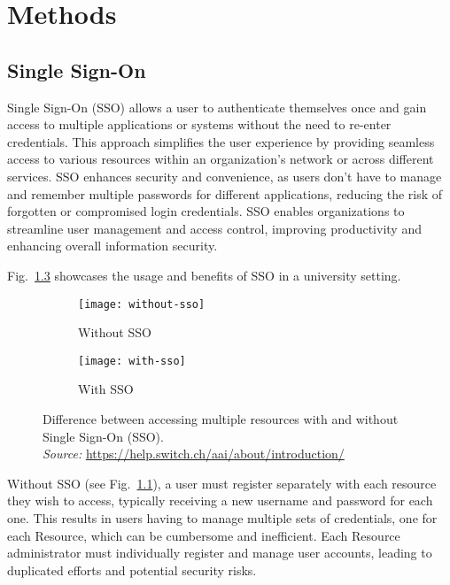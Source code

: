 \chapter{Methods}\label{chapter:methods}

\section{Single Sign-On}

Single Sign-On (SSO) allows a user to authenticate themselves once and gain
access to multiple applications or systems without the need to re-enter
credentials. This approach simplifies the user experience by providing seamless
access to various resources within an organization's network or across different
services. SSO enhances security and convenience, as users don't have to manage
and remember multiple passwords for different applications, reducing the risk of
forgotten or compromised login credentials. SSO enables organizations to
streamline user management and access control, improving productivity and
enhancing overall information security.

Fig.~\ref{fig:sso} showcases the usage and benefits of SSO in a university
setting.

\begin{figure}[htb]
    \centering
    \begin{subfigure}{0.49\textwidth}
      \centering
      \texttt{[image: without-sso]}
      \caption{Without SSO}
      \label{fig:without-sso}
    \end{subfigure}
    \hfill
    \begin{subfigure}{0.49\textwidth}
      \centering
      \texttt{[image: with-sso]}
      \caption{With SSO}
      \label{fig:with-sso}
    \end{subfigure}
      \caption{Difference between accessing multiple resources with and without
      Single Sign-On (SSO). \\ \textit{Source:}
      \url{https://help.switch.ch/aai/about/introduction/}} 
      \label{fig:sso}
\end{figure}

Without SSO (see Fig.~\ref{fig:without-sso}), a user must register separately
with each resource they wish to access, typically receiving a new username and
password for each one. This results in users having to manage multiple sets of
credentials, one for each Resource, which can be cumbersome and inefficient.
Each Resource administrator must individually register and manage user accounts,
leading to duplicated efforts and potential security risks.

